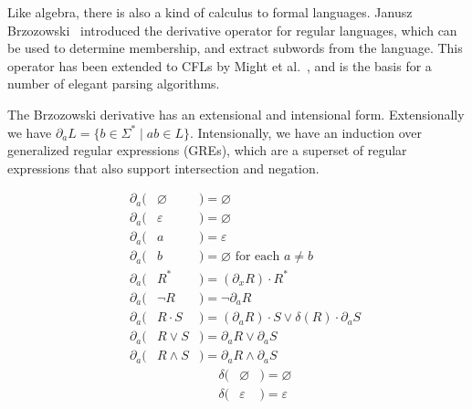 Like algebra, there is also a kind of calculus to formal languages. Janusz Brzozowski~\cite{brzozowski1964derivatives} introduced the derivative operator for regular languages, which can be used to determine membership, and extract subwords from the language. This operator has been extended to CFLs by Might et al.~\cite{might2011parsing}, and is the basis for a number of elegant parsing algorithms.

The Brzozowski derivative has an extensional and intensional form. Extensionally we have $\partial_a L = \{b \in \Sigma^* \mid ab \in L\}$. Intensionally, we have an induction over generalized regular expressions (GREs), which are a superset of regular expressions that also support intersection and negation.\vspace{-1cm}

\begin{multicols}{2}
  \begin{eqnarray*}
    \phantom{-}\partial_a( & \varnothing & )= \varnothing                                           \\
    \phantom{-}\partial_a( & \varepsilon & )= \varnothing                                           \\
    \phantom{-}\partial_a( & a           & )= \varepsilon                                           \\
    \phantom{-}\partial_a( & b           & )= \varnothing  \text{ for each } a \neq b               \\
    \phantom{-}\partial_a( & R^*         & )= (\partial_x R)\cdot R^*                               \\
    \phantom{-}\partial_a( & \neg R      & )= \neg \partial_a R                                     \\
    \phantom{-}\partial_a( & R\cdot S    & )= (\partial_a R)\cdot S \vee \delta(R)\cdot\partial_a S \\
    \phantom{-}\partial_a( & R\vee S     & )= \partial_a R \vee \partial_a S                        \\
    \phantom{-}\partial_a( & R\land S    & )= \partial_a R \land \partial_a S
  \end{eqnarray*} \break\vspace{-0.5cm}
  \begin{eqnarray*}
    \phantom{---}\delta(& \varnothing &)= \varnothing                                      \\
    \phantom{---}\delta(& \varepsilon &)= \varepsilon                                      \\

\end{eqnarray*}
\end{multicols}
